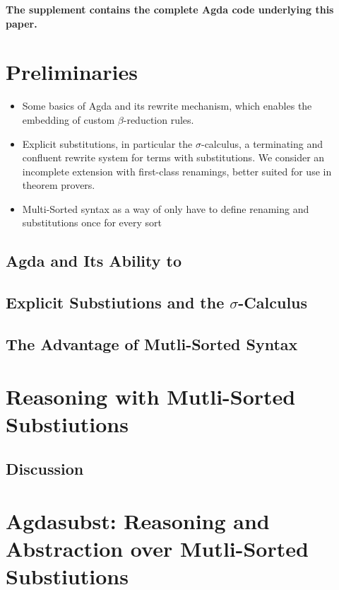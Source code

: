 \documentclass[screen,nonacm]{acmart}
\begin{document}
\textbf{The supplement contains the complete Agda code underlying this paper.}

\section{Preliminaries}\label{sec:preliminaries}

\begin{itemize}
  \item Some basics of Agda and its rewrite mechanism, which enables the embedding of
        custom $\beta$-reduction rules.
  \item Explicit substitutions, in particular the $\sigma$-calculus, a terminating and
        confluent rewrite system for terms with substitutions. We consider an
        incomplete extension with first-class renamings, better suited for use in
        theorem provers.
  \item Multi-Sorted syntax as a way of only have to define renaming and substitutions
        once for every sort
\end{itemize}

\subsection{Agda and Its Ability to }

\subsection{Explicit Substiutions and the $\sigma$-Calculus}

\subsection{The Advantage of Mutli-Sorted Syntax}

\section{Reasoning with Mutli-Sorted Substiutions}\label{sec:multi}

\subsection{Discussion}\label{sec:discussion-1}

\section{Agdasubst: Reasoning and Abstraction over Mutli-Sorted Substiutions}\label{sec:agdasubst}
\end{document}
